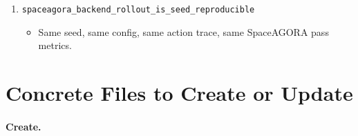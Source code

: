 \documentclass[11pt]{article}
\begin{document}
\begin{enumerate}
\begin{itemize}
\end{itemize}
\item \texttt{spaceagora\_backend\_rollout\_is\_seed\_reproducible}
\begin{itemize}
\item Same seed, same config, same action trace, same SpaceAGORA pass metrics.


\end{itemize}
\end{enumerate}
\section{Concrete Files to Create or Update}

\paragraph{Create.}
\end{document}
